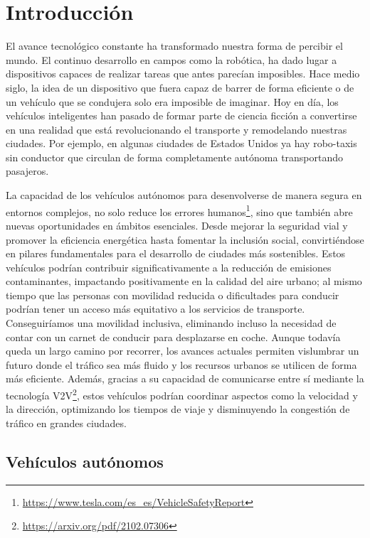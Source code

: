 \chapter{Introducción}
\label{cap:introduccion}
\setcounter{page}{1}

El avance tecnológico constante ha transformado nuestra forma de percibir el mundo. El continuo desarrollo en campos como la robótica, ha dado lugar a dispositivos capaces de realizar tareas que antes parecían imposibles. Hace medio siglo, la idea de un dispositivo que fuera capaz de barrer de forma eficiente o de un vehículo que se condujera solo era imposible de imaginar. Hoy en día, los vehículos inteligentes han pasado de formar parte de ciencia ficción a convertirse en una realidad que está revolucionando el transporte y remodelando nuestras ciudades. Por ejemplo, en algunas ciudades de Estados Unidos ya hay robo-taxis sin conductor que circulan de forma completamente autónoma transportando pasajeros.

La capacidad de los vehículos autónomos para desenvolverse de manera segura en entornos complejos, no solo reduce los errores humanos\footnote{\url{https://www.tesla.com/es_es/VehicleSafetyReport}}, sino que también abre nuevas oportunidades en ámbitos esenciales. Desde mejorar la seguridad vial y promover la eficiencia energética hasta fomentar la inclusión social, convirtiéndose en pilares fundamentales para el desarrollo de ciudades más sostenibles. Estos vehículos podrían contribuir significativamente a la reducción de emisiones contaminantes, impactando positivamente en la calidad del aire urbano; al mismo tiempo que las personas con movilidad reducida o dificultades para conducir podrían tener un acceso más equitativo a los servicios de transporte. Conseguiríamos una movilidad inclusiva, eliminando incluso la necesidad de contar con un carnet de conducir para desplazarse en coche. Aunque todavía queda un largo camino por recorrer, los avances actuales permiten vislumbrar un futuro donde el tráfico sea más fluido y los recursos urbanos se utilicen de forma más eficiente. Además, gracias a su capacidad de comunicarse entre sí mediante la tecnología \ac{V2V}\footnote{\url{https://arxiv.org/pdf/2102.07306}}, estos vehículos podrían coordinar aspectos como la velocidad y la dirección, optimizando los tiempos de viaje y disminuyendo la congestión de tráfico en grandes ciudades.

\section{Vehículos autónomos}
\label{sec:vehículos}

